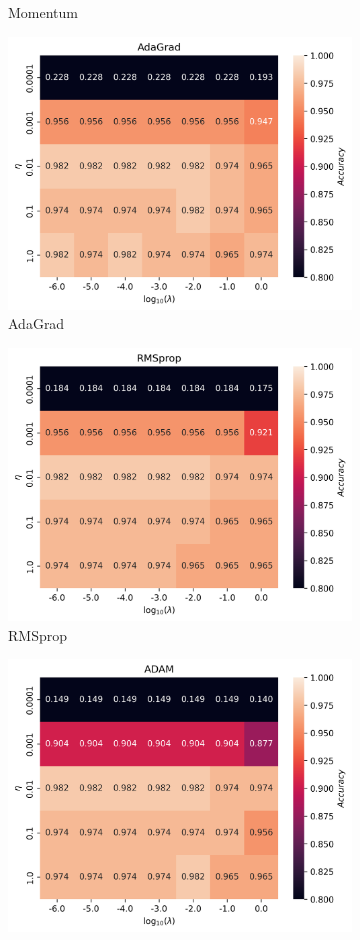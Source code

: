 \documentclass[11pt]{article}
\begin{document}
\begin{figure}[H]
\begin{subfigure}{.5\textwidth}
    \caption{Momentum}
    \label{fig:}
  \end{subfigure}
  \begin{subfigure}{.5\textwidth}
    \centering
    \includegraphics[width=.95\textwidth]{../figures/logreg_AdaGrad.png}
    \caption{AdaGrad}
    \label{fig:}
  \end{subfigure}
  \begin{subfigure}{.5\textwidth}
    \centering
    \includegraphics[width=.95\textwidth]{../figures/logreg_RMSprop.png}
    \caption{RMSprop}
    \label{fig:}
  \end{subfigure}
  \begin{subfigure}{.95\textwidth}
    \centering
    \includegraphics[width=.5\textwidth]{../figures/logreg_ADAM.png}

\end{subfigure}
\end{figure}
\end{document}

